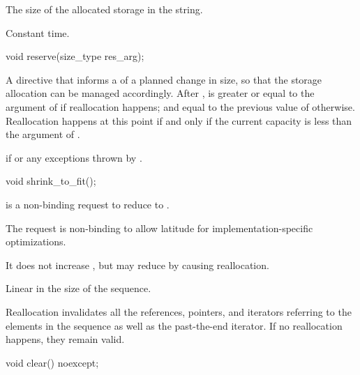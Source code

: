 \begin{itemdescr}
\pnum
\returns
The size of the allocated storage in the string.

\pnum
\complexity Constant time.
\end{itemdescr}

%
\begin{itemdecl}
void reserve(size_type res_arg);
\end{itemdecl}

\begin{itemdescr}
\pnum
\effects
A directive that informs a  of a planned change in size,
so that the storage allocation can be managed accordingly.
After
,
is greater or equal to the argument of
if reallocation happens; and
equal to the previous value of
otherwise.
Reallocation happens at this point if and only if
the current capacity is less than the argument of .

\pnum
\throws
{}
if
 or any exceptions thrown by
 .
\end{itemdescr}

%
\begin{itemdecl}
void shrink_to_fit();
\end{itemdecl}

\begin{itemdescr}
\pnum
\effects {} is a non-binding request to reduce
 to . \begin{note} The request is non-binding to
allow latitude for implementation-specific optimizations. \end{note}
It does not increase , but may reduce 
by causing reallocation.

\pnum
\complexity Linear in the size of the sequence.

\pnum
\remarks Reallocation invalidates all the references, pointers, and iterators
referring to the elements in the sequence as well as the past-the-end iterator.
If no reallocation happens, they remain valid.
\end{itemdescr}

%
\begin{itemdecl}
void clear() noexcept;
\end{itemdecl}

